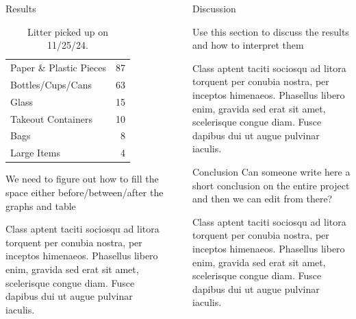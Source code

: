 \documentclass[final]{beamer}
\newlength{\sepwidth}
\newlength{\colwidth}
\newcommand{\separatorcolumn}{\begin{column}{\sepwidth}\end{column}}
\begin{document}
\begin{frame}[t]
\begin{columns}[t]
\begin{column}{\colwidth}
\begin{block}{Results}
\begin{table}
\begin{tabular}{l r }
              \midrule
              Paper \& Plastic Pieces& 87\\
              Bottles/Cups/Cans& 63\\
              Glass& 15\\
              Takeout Containers& 10\\
              Bags& 8\\
              Large Items& 4\\
              \bottomrule
            \end{tabular}
            \caption{Litter picked up on 11/25/24.}
          \end{table}



          We need to figure out how to fill the space either before/between/after the graphs and table\par
          Class aptent taciti sociosqu ad litora torquent per conubia nostra, per
          inceptos himenaeos. Phasellus libero enim, gravida sed erat sit amet,
          scelerisque congue diam. Fusce dapibus dui ut augue pulvinar iaculis.
        \end{block}

      \end{column}

      \separatorcolumn

      \begin{column}{\colwidth}

        \begin{block}{Discussion}


          Use this section to discuss the results and how to interpret them \par
          Class aptent taciti sociosqu ad litora torquent per conubia nostra, per
          inceptos himenaeos. Phasellus libero enim, gravida sed erat sit amet,
          scelerisque congue diam. Fusce dapibus dui ut augue pulvinar iaculis.

        \end{block}

        \begin{block}{Conclusion}
          Can someone write here a short conclusion on the entire project and then we can edit from there? \par
          Class aptent taciti sociosqu ad litora torquent per conubia nostra, per
          inceptos himenaeos. Phasellus libero enim, gravida sed erat sit amet,
          scelerisque congue diam. Fusce dapibus dui ut augue pulvinar iaculis.


\end{block}
\end{column}
\end{columns}
\end{frame}
\end{document}
